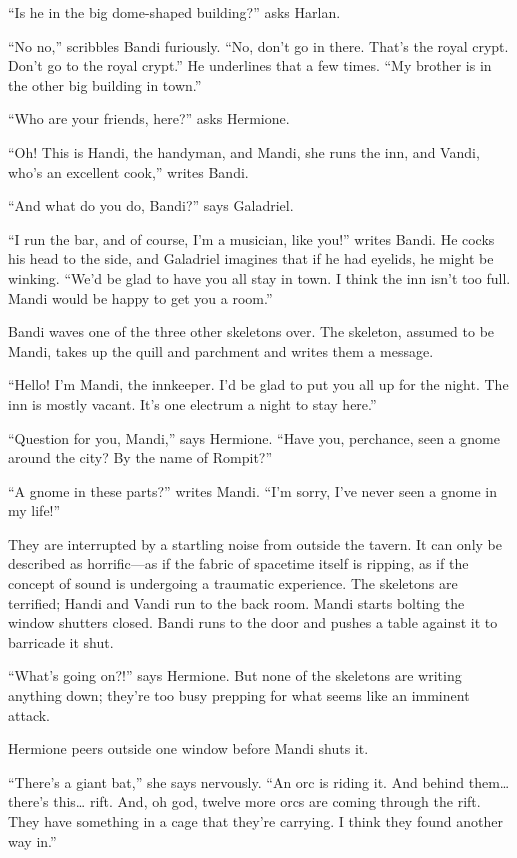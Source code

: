 \documentclass[smalldemyvopaper,11pt,twoside,onecolumn,openright,extrafontsizes]{memoir}
\begin{document}
``Is he in the big dome-shaped building?'' asks Harlan.

``No no,'' scribbles Bandi furiously. ``No, don't go in there. That's
the royal crypt. Don't go to the royal crypt.'' He underlines that a few
times. ``My brother is in the other big building in town.''

``Who are your friends, here?'' asks Hermione.

``Oh! This is Handi, the handyman, and Mandi, she runs the inn, and
Vandi, who's an excellent cook,'' writes Bandi.

``And what do you do, Bandi?'' says Galadriel.

``I run the bar, and of course, I'm a musician, like you!'' writes
Bandi. He cocks his head to the side, and Galadriel imagines that if he
had eyelids, he might be winking. ``We'd be glad to have you all stay in
town. I think the inn isn't too full. Mandi would be happy to get you a
room.''

Bandi waves one of the three other skeletons over. The skeleton, assumed
to be Mandi, takes up the quill and parchment and writes them a message.

``Hello! I'm Mandi, the innkeeper. I'd be glad to put you all up for the
night. The inn is mostly vacant. It's one electrum a night to stay
here.''

``Question for you, Mandi,'' says Hermione. ``Have you, perchance, seen
a gnome around the city? By the name of Rompit?''

``A gnome in these parts?'' writes Mandi. ``I'm sorry, I've never seen a
gnome in my life!''

They are interrupted by a startling noise from outside the tavern. It
can only be described as horrific---as if the fabric of spacetime itself
is ripping, as if the concept of sound is undergoing a traumatic
experience. The skeletons are terrified; Handi and Vandi run to the back
room. Mandi starts bolting the window shutters closed. Bandi runs to the
door and pushes a table against it to barricade it shut.

``What's going on?!'' says Hermione. But none of the skeletons are
writing anything down; they're too busy prepping for what seems like an
imminent attack.

Hermione peers outside one window before Mandi shuts it.

``There's a giant bat,'' she says nervously. ``An orc is riding it. And
behind them\ldots{} there's this\ldots{} rift. And, oh god, twelve more
orcs are coming through the rift. They have something in a cage that
they're carrying. I think they found another way in.''
\end{document}
